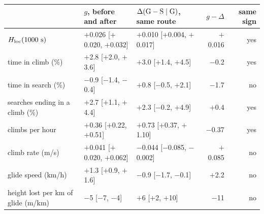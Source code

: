 \begin{tabular}{@{}l l l r r@{}}
\toprule
 & $g$, before and after & $\Delta(\mathrm{G}-\mathrm{S}\mid\mathrm{G})$, same route & $g-\Delta$ & same sign \\
\midrule
$H_\mathrm{loc}(1000~\mathrm{s})$ & $+$0.026 [$+$0.020, $+$0.032] & $+$0.010 [$+$0.004, $+$0.017] & $+$0.016 & yes \\
time in climb (\%) & $+$2.8 [$+$2.0, $+$3.6] & $+$3.0 [$+$1.4, $+$4.5] & $-$0.2 & yes \\
time in search (\%) & $-$0.9 [$-$1.4, $-$0.4] & $+$0.8 [$-$0.5, $+$2.1] & $-$1.7 & no \\
searches ending in a climb (\%) & $+$2.7 [$+$1.1, $+$4.4] & $+$2.3 [$-$0.2, $+$4.9] & $+$0.4 & yes \\
climbs per hour & $+$0.36 [$+$0.22, $+$0.51] & $+$0.73 [$+$0.37, $+$1.10] & $-$0.37 & yes \\
climb rate (m/s) & $+$0.041 [$+$0.020, $+$0.062] & $-$0.044 [$-$0.085, $-$0.002] & $+$0.085 & no \\
glide speed (km/h) & $+$1.3 [$+$0.9, $+$1.6] & $-$0.9 [$-$1.7, $-$0.1] & $+$2.2 & no \\
height lost per km of glide (m/km) & $-$5 [$-$7, $-$4] & $+$6 [$+$2, $+$10] & $-$11 & no \\
\bottomrule
\end{tabular}
